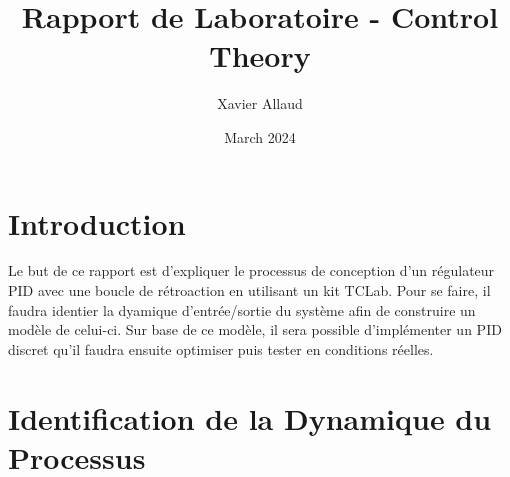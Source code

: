 \documentclass{article}
\title{Rapport de Laboratoire - Control Theory}
\author{Xavier Allaud}
\date{March 2024}
\begin{document}
\maketitle

\section{Introduction}
Le but de ce rapport est d'expliquer le processus de conception d'un régulateur PID avec une boucle de rétroaction en utilisant un kit TCLab. Pour se faire, il faudra identier la dyamique d'entrée/sortie du système afin de construire un modèle de celui-ci. Sur base de ce modèle, il sera possible d'implémenter un PID discret qu'il faudra ensuite optimiser puis tester en conditions réelles.

\tableofcontents

\newpage

\section{Identification de la Dynamique du Processus}
\end{document}
